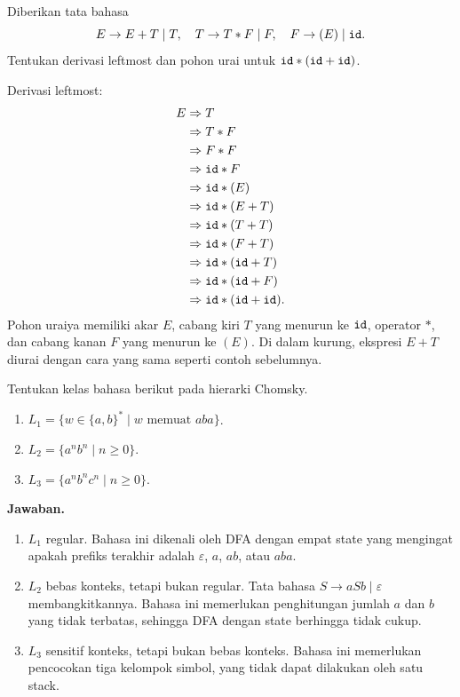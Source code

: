 \begin{contoh}
Diberikan tata bahasa
\[
E \to E + T \mid T, \quad
T \to T * F \mid F, \quad
F \to (E) \mid \texttt{id}.
\]
Tentukan derivasi leftmost dan pohon urai untuk
\(\texttt{id} * (\texttt{id} + \texttt{id})\).

Derivasi leftmost:
\[
\begin{aligned}
E &\Rightarrow T\\
  &\Rightarrow T * F\\
  &\Rightarrow F * F\\
  &\Rightarrow \texttt{id} * F\\
  &\Rightarrow \texttt{id} * (E)\\
  &\Rightarrow \texttt{id} * (E + T)\\
  &\Rightarrow \texttt{id} * (T + T)\\
  &\Rightarrow \texttt{id} * (F + T)\\
  &\Rightarrow \texttt{id} * (\texttt{id} + T)\\
  &\Rightarrow \texttt{id} * (\texttt{id} + F)\\
  &\Rightarrow \texttt{id} * (\texttt{id} + \texttt{id}).
\end{aligned}
\]
Pohon uraiya memiliki akar \(E\), cabang kiri \(T\) yang menurun ke
\(\texttt{id}\), operator \(*\), dan cabang kanan \(F\) yang menurun ke
\((E)\). Di dalam kurung, ekspresi \(E + T\) diurai dengan cara yang
sama seperti contoh sebelumnya.
\end{contoh}

\begin{contoh}
Tentukan kelas bahasa berikut pada hierarki Chomsky.
\begin{enumerate}[label=(\alph*),leftmargin=*]
  \item \(L_1 = \{w \in \{a,b\}^{*} \mid w \text{ memuat } aba\}\).
  \item \(L_2 = \{a^n b^n \mid n \ge 0\}\).
  \item \(L_3 = \{a^n b^n c^n \mid n \ge 0\}\).
\end{enumerate}
\textbf{Jawaban.}
\begin{enumerate}[label=(\alph*),leftmargin=*]
  \item \(L_1\) regular. Bahasa ini dikenali oleh DFA dengan empat
        state yang mengingat apakah prefiks terakhir adalah
        \(\varepsilon\), \(a\), \(ab\), atau \(aba\).
  \item \(L_2\) bebas konteks, tetapi bukan regular. Tata bahasa
        \(S \to aSb \mid \varepsilon\) membangkitkannya. Bahasa ini
        memerlukan penghitungan jumlah \(a\) dan \(b\) yang tidak
        terbatas, sehingga DFA dengan state berhingga tidak cukup.
  \item \(L_3\) sensitif konteks, tetapi bukan bebas konteks. Bahasa
        ini memerlukan pencocokan tiga kelompok simbol, yang tidak
        dapat dilakukan oleh satu stack.
\end{enumerate}
\end{contoh}
